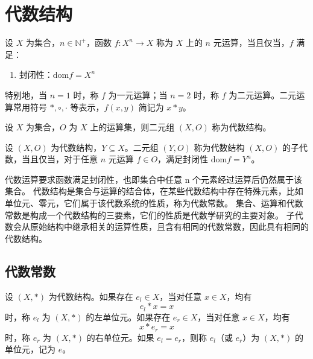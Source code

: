 \section{代数结构}

\begin{definition}
    设 $ X $ 为集合，$ n\in \mathbb{N}^+ $，函数 $ f:X^n \to X $ 称为 $ X $ 上的 $ n $ 元运算，当且仅当，$f$ 满足：
    \begin{enumerate}
        \item 封闭性：$ \mathrm{dom}f = X^n $
    \end{enumerate}
    特别地，当 $ n=1 $ 时，称 $ f $ 为一元运算；当 $ n=2 $ 时，称 $ f $ 为二元运算。二元运算常用符号 $ \ast,\circ,\cdot $ 等表示，$ f(x,y) $ 简记为 $ x \ast y $。
\end{definition}

    
\begin{definition}
    设 $ X $ 为集合，$ O $ 为 $ X $ 上的运算集，则二元组 $ (X,O) $ 称为代数结构。
\end{definition}

\begin{definition}
    设 $ (X,O) $ 为代数结构，$ Y\subseteq X $。二元组 $ (Y,O) $ 称为代数结构 $ (X,O) $ 的子代数，当且仅当，对于任意 $ n $ 元运算 $ f\in O $，满足封闭性 $ \mathrm{dom}f = Y^n $。
\end{definition}
\vspace{1em}

\begin{note}
    代数运算要求函数满足封闭性，也即集合中任意 n 个元素经过运算后仍然属于该集合。
    代数结构是集合与运算的结合体，在某些代数结构中存在特殊元素，比如单位元、零元，它们属于该代数系统的性质，称为代数常数。
    集合、运算和代数常数是构成一个代数结构的三要素，它们的性质是代数学研究的主要对象。
    子代数会从原始结构中继承相关的运算性质，且含有相同的代数常数，因此具有相同的代数结构。
\end{note}
\vspace{1em}

\subsection{代数常数}

\begin{definition}
    设 $ (X,\ast) $ 为代数结构。如果存在 $ e_l\in X $，当对任意 $ x\in X $，均有
    \[
        e_l \ast x = x
    \]
    时，称 $ e_l $ 为 $ (X,\ast) $ 的左单位元。如果存在 $ e_r\in X $，当对任意 $ x\in X $，均有
    \[
        x \ast e_r = x
    \]
    时，称 $ e_r $ 为 $ (X,\ast) $ 的右单位元。如果 $ e_l = e_r $，则称 $ e_l $（或 $ e_r $）为 $ (X,\ast) $ 的单位元，记为 $ e $。
\end{definition}

